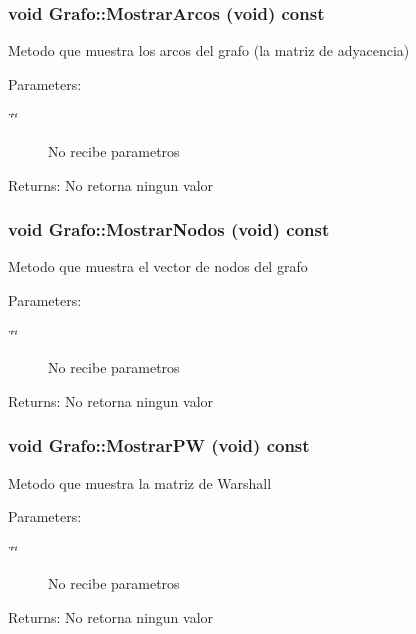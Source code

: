 \subsubsection{\setlength{\rightskip}{0pt plus 5cm}void Grafo::MostrarArcos (void) const}\label{classGrafo_5c365de560d70bb0f943827be01e3a6a}


Metodo que muestra los arcos del grafo (la matriz de adyacencia) \begin{Desc}
\item[Parameters:]
\begin{description}
\item[{\em \char`\"{}\char`\"{}}]No recibe parametros \end{description}
\end{Desc}
\begin{Desc}
\item[Returns:]No retorna ningun valor \end{Desc}
\subsubsection{\setlength{\rightskip}{0pt plus 5cm}void Grafo::MostrarNodos (void) const}\label{classGrafo_f398482951c2d0d9ed485ae3a737158c}


Metodo que muestra el vector de nodos del grafo \begin{Desc}
\item[Parameters:]
\begin{description}
\item[{\em \char`\"{}\char`\"{}}]No recibe parametros \end{description}
\end{Desc}
\begin{Desc}
\item[Returns:]No retorna ningun valor \end{Desc}
\subsubsection{\setlength{\rightskip}{0pt plus 5cm}void Grafo::MostrarPW (void) const}\label{classGrafo_12cff6a9e93b23ab60eb5d5d12f8e218}


Metodo que muestra la matriz de Warshall \begin{Desc}
\item[Parameters:]
\begin{description}
\item[{\em \char`\"{}\char`\"{}}]No recibe parametros \end{description}
\end{Desc}
\begin{Desc}
\item[Returns:]No retorna ningun valor \end{Desc}
